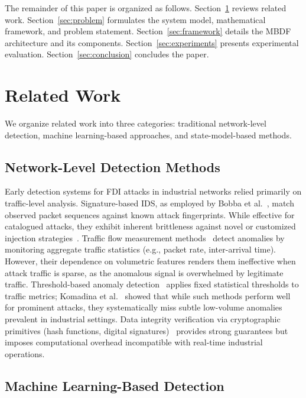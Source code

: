 \documentclass[manuscript,screen,review]{acmart}
\begin{document}
The remainder of this paper is organized as follows.
Section~\ref{sec:related} reviews related work.
Section~\ref{sec:problem} formulates the system model,
mathematical framework, and problem statement.
Section~\ref{sec:framework} details the MBDF architecture
and its components.
Section~\ref{sec:experiments} presents experimental evaluation.
Section~\ref{sec:conclusion} concludes the paper.

\section{Related Work}
\label{sec:related}

We organize related work into three categories: traditional
network-level detection, machine learning-based approaches,
and state-model-based methods.

\subsection{Network-Level Detection Methods}

Early detection systems for FDI attacks in industrial networks
relied primarily on traffic-level analysis. Signature-based IDS,
as employed by Bobba et al.~\cite{ref3}, match observed packet
sequences against known attack fingerprints. While effective for
catalogued attacks, they exhibit inherent brittleness against
novel or customized injection strategies~\cite{ref4}. Traffic
flow measurement methods~\cite{ref6,ref24,ref25} detect anomalies
by monitoring aggregate traffic statistics (e.g., packet rate,
inter-arrival time). However, their dependence on volumetric
features renders them ineffective when attack traffic is sparse,
as the anomalous signal is overwhelmed by legitimate traffic.
Threshold-based anomaly detection~\cite{ref8} applies fixed
statistical thresholds to traffic metrics; Komadina et
al.~\cite{ref8} showed that while such methods perform well
for prominent attacks, they systematically miss subtle
low-volume anomalies prevalent in industrial settings.
Data integrity verification via cryptographic primitives
(hash functions, digital signatures)~\cite{ref7} provides
strong guarantees but imposes computational overhead
incompatible with real-time industrial operations.

\subsection{Machine Learning-Based Detection}
\end{document}
